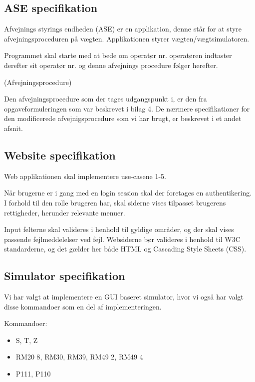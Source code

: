 \documentclass[a4paper]{article}
\begin{document}
\subsection{ASE specifikation} %

Afvejnings styrings endheden (ASE) er en applikation, denne står for at styre afvejningsproceduren på vægten. Applikationen styrer vægten/vægtsimulatoren. 

Programmet skal starte med at bede om operatør nr. operatøren indtaster derefter sit operatør nr. og denne afvejnings procedure følger herefter.

 (Afvejningsprocedure)

Den afvejningsprocedure som der tages udgangspunkt i, er den fra opgaveformuleringen som var beskrevet i bilag 4. De nærmere specifikationer for den modificerede afvejnigsprocedure som vi har brugt, er beskrevet i et andet afsnit. 


\subsection{Website specifikation} %

Web applikationen skal implementere use-casene 1-5.

Når brugerne er i gang med en login session skal der foretages en authentikering. I forhold til den rolle brugeren har, skal siderne vises tilpasset brugerens rettigheder, herunder relevante menuer.

Input felterne skal valideres i henhold til gyldige områder, og der skal vises passende fejlmeddelelser ved fejl. Websiderne bør valideres i henhold til W3C standarderne, og det gælder her både HTML og Cascading Style Sheets (CSS).


\subsection{Simulator specifikation} %

Vi har valgt at implementere en GUI baseret simulator, hvor vi også har valgt disse kommandoer som en del af implementeringen.

Kommandoer:

\begin{itemize}
  \item S, T, Z
  \item RM20 8, RM30, RM39, RM49 2, RM49 4
  \item P111, P110
\end{itemize}
\end{document}
